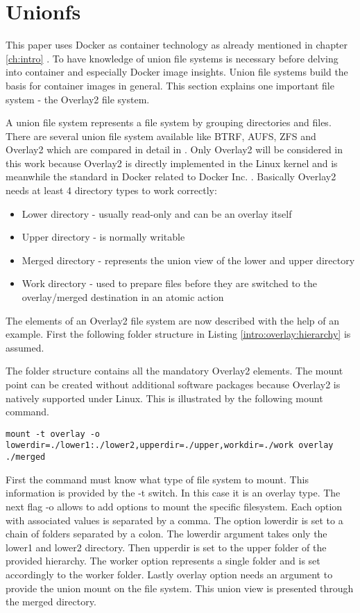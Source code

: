 \section{Unionfs}
\label{sec:intro:docker_image:unionfs}
This paper uses Docker as container technology as already mentioned in chapter \ref{ch:intro} .
To have knowledge of union file systems is necessary before delving into container and especially Docker image insights.
Union file systems build the basis for container images in general. This section explains one important file system - the Overlay2 file system.

A union file system represents a file system by grouping directories and files. There are several union file system available like BTRF, AUFS, ZFS and Overlay2 which are compared in detail in \cite{Tarasov2019}.
Only Overlay2 will be considered in this work because Overlay2 is directly implemented in the Linux kernel \cite{Tarasov2019} and is meanwhile the standard in Docker related to Docker Inc. \cite{docker_storage_driver}.
Basically Overlay2 needs at least 4 directory types to work correctly:
\begin{itemize}
\item Lower directory - usually read-only and can be an overlay itself
\item Upper directory - is normally writable
\item Merged directory - represents the union view of the lower and upper directory
\item Work directory - used to prepare files before they are switched to the overlay/merged destination in an atomic action 
\end{itemize}
The elements of an Overlay2 file system are now described with the help of an example. 
First the following folder structure in Listing \ref{intro:overlay:hierarchy} is assumed.

The folder structure contains all the mandatory Overlay2 elements. The mount point can be created without additional software packages because Overlay2 is natively supported under Linux.
This is illustrated by the following mount command.
\begin{lstlisting}[label={intro:overlay:mountcmd}]
	mount -t overlay -o lowerdir=./lower1:./lower2,upperdir=./upper,workdir=./work overlay ./merged
\end{lstlisting}
First the command must know what type of file system to mount. This information is provided by the -t switch. In this case it is an overlay type. The next flag -o allows to add options to mount the specific filesystem. Each option with associated values is separated by a comma. The option lowerdir is set to a chain of folders separated by a colon. The lowerdir argument takes only the lower1 and lower2 directory. Then upperdir is set to the upper folder of the provided hierarchy. The worker option represents a single folder and is set accordingly to the worker folder. Lastly overlay option needs an argument to provide the union mount on the file system. This union view is presented through the merged directory.

